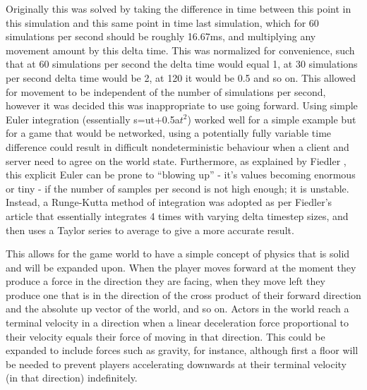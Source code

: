\documentclass[titlepage]{article}
\begin{document}
	Originally this was solved by taking the difference in time between this point in this simulation and this same point in time last simulation, which for 60 simulations per second should be roughly 16.67ms, and multiplying any movement amount by this delta time. This was normalized for convenience, such that at 60 simulations per second the delta time would equal 1, at 30 simulations per second delta time would be 2, at 120 it would be 0.5 and so on. This allowed for movement to be independent of the number of simulations per second, however it was decided this was inappropriate to use going forward. Using simple Euler integration (essentially s=ut+0.5a$t^2$) worked well for a simple example but for a game that would be networked, using a potentially fully variable time difference could result in difficult nondeterministic behaviour when a client and server need to agree on the world state. Furthermore, as explained by Fiedler \cite{fiedlerInteg}, this explicit Euler can be prone to ``blowing up'' - it's values becoming enormous or tiny - if the number of samples per second is not high enough; it is unstable. Instead, a Runge-Kutta \cite{wolframRK4} method of integration was adopted as per Fiedler's article \cite{fiedlerInteg} that essentially integrates 4 times with varying delta timestep sizes, and then uses a Taylor series to average to give a more accurate result.

	This allows for the game world to have a simple concept of physics that is solid and will be expanded upon. When the player moves forward at the moment they produce a force in the direction they are facing, when they move left they produce one that is in the direction of the cross product of their forward direction and the absolute up vector of the world, and so on. Actors in the world reach a terminal velocity in a direction when a linear deceleration force proportional to their velocity equals their force of moving in that direction. This could be expanded to include forces such as gravity, for instance, although first a floor will be needed to prevent players accelerating downwards at their terminal velocity (in that direction) indefinitely.
\end{document}
